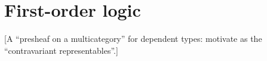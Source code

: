 \chapter{First-order logic}
\label{chap:fol}

[A ``presheaf on a multicategory'' for dependent types: motivate as the ``contravariant representables''.]

